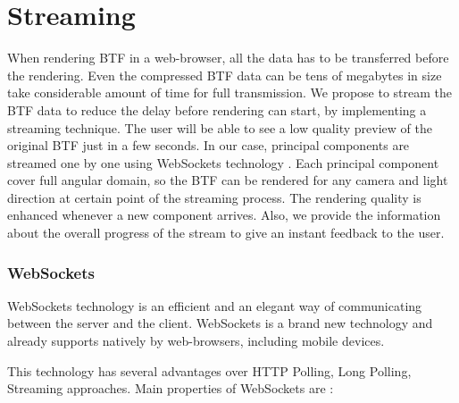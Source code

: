 \chapter{Streaming}
\label{chapter:streaming}

When rendering BTF in a web-browser, all the data has to be transferred before the rendering.
Even the compressed BTF data can be tens of megabytes in size take considerable amount of time for full transmission.
We propose to stream the BTF data to reduce the delay before rendering can start,
by implementing a streaming technique.
 The user will be able to see a low quality preview of the original BTF just in a few seconds. 
In our case, principal components are streamed one by one using WebSockets technology \cite{WebSockets}.
Each principal component cover full angular domain, so the BTF can be rendered for any camera and light direction at certain point of the streaming process.
The rendering quality is enhanced whenever a new component arrives.
 Also, we provide the information about the overall progress of the stream to give an instant feedback to the user.
 
\subsection{WebSockets}
\label{chapter:sockets}

 WebSockets technology is an efficient and an elegant way of communicating between the server and the client.
 WebSockets is a brand new technology and already supports natively by web-browsers, including mobile devices.
 
This technology has several advantages over HTTP Polling, Long Polling, Streaming approaches. Main properties of WebSockets are  \cite[Ch.\ 1]{WebSockets}:

